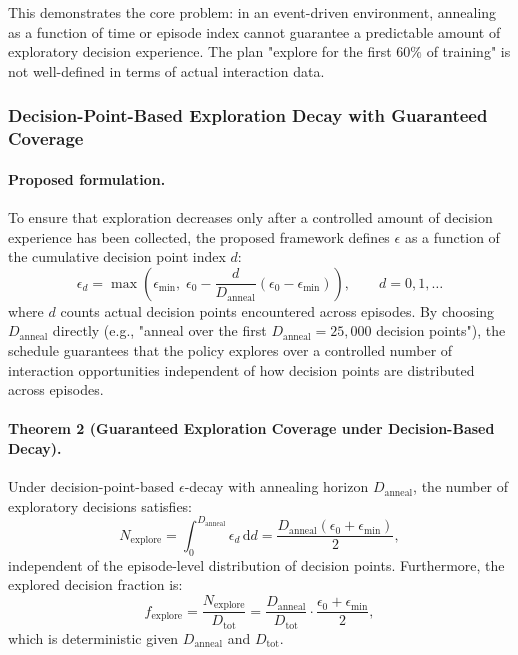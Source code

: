 This demonstrates the core problem: in an event-driven environment, annealing as
a function of time or episode index cannot guarantee a predictable amount of
exploratory decision experience. The plan "explore for the first $60\%$ of
training" is not well-defined in terms of actual interaction data.

\subsubsection{Decision-Point-Based Exploration Decay with Guaranteed Coverage}

\paragraph{Proposed formulation.}
To ensure that exploration decreases only after a controlled amount of decision
experience has been collected, the proposed framework defines $\epsilon$ as a
function of the cumulative decision point index $d$:
\begin{equation}
\epsilon_d
=
\max\!\left(
\epsilon_{\min},
\;
\epsilon_0 - \frac{d}{D_{\mathrm{anneal}}}
(\epsilon_0 - \epsilon_{\min})
\right),
\qquad d=0,1,\dots
\label{eq:decision_based_epsilon_final}
\end{equation}
where $d$ counts actual decision points encountered across episodes.
By choosing $D_{\mathrm{anneal}}$ directly (e.g., "anneal over the first
$D_{\mathrm{anneal}}=25{,}000$ decision points"), the schedule guarantees that the
policy explores over a controlled number of interaction opportunities
independent of how decision points are distributed across episodes.

\paragraph{Theorem 2 (Guaranteed Exploration Coverage under Decision-Based Decay).}
\label{thm:decision_based_guarantee}
Under decision-point-based $\epsilon$-decay with annealing horizon
$D_{\mathrm{anneal}}$, the number of exploratory decisions satisfies:
\begin{equation}
N_{\text{explore}}
= \int_0^{D_{\mathrm{anneal}}} \epsilon_d \, \mathrm{d}d
= \frac{D_{\mathrm{anneal}}(\epsilon_0 + \epsilon_{\min})}{2},
\label{eq:guaranteed_exploration}
\end{equation}
independent of the episode-level distribution of decision points. Furthermore,
the explored decision fraction is:
\begin{equation}
f_{\text{explore}}
= \frac{N_{\text{explore}}}{D_{\text{tot}}}
= \frac{D_{\mathrm{anneal}}}{D_{\text{tot}}} \cdot
\frac{\epsilon_0 + \epsilon_{\min}}{2},
\label{eq:guaranteed_fraction}
\end{equation}
which is deterministic given $D_{\mathrm{anneal}}$ and $D_{\text{tot}}$.

